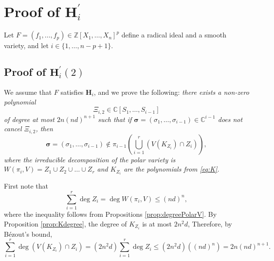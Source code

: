 \documentclass[a4paper]{article}
\newcommand{\ZZ}{{\mathbb{Z}}}
\def\C{\mathbb{C}}
\begin{document}
\section{Proof of $\textbf{H}_i^{'}$}\label{Sec:Hip}
Let $F = (f_1,\hdots,f_p) \in \ZZ[X_1,\hdots,X_n]^p$  define a radical ideal and a smooth variety, and let $i\in \{1,\hdots,n-p+1\}$. 
\subsection{Proof of $\textbf{H}_i^{'}(2)$}\label{proof:hip2}
%
We assume that $F$ satisfies $\textbf{H}_i$, and we prove the following: {\em
  there exists a non-zero polynomial 
  \[\Xi_{i,2} \in
  \C[S_1,\dots,S_{i-1}]\] 
  of degree at most $2n(nd)^{n+1}$ such that if $
  \bm \sigma = (\sigma_1,\hdots,\sigma_{i-1}) \in \C^{i-1}$ does not cancel
  $\Xi_{i,2}$, then 
  \[\bm \sigma = (\sigma_1,\hdots,\sigma_{i-1}) \not \in \pi_{i-1} \left(\bigcup_{i=1}^r \left(V(K_{Z_i}) \cap Z_i\right)\right),\]
  where the irreducible decomposition of the polar variety is $W(\pi_i,V) = Z_1 \cup Z_2 \cup \hdots \cup Z_r$ and $K_{Z_i}$ are the polynomials from \ref{eq:K}.}

\smallskip


First note that 
\[
\sum_{i=1}^r \deg Z_i = \deg W(\pi_i,V) \leq (nd)^n,
\]
where the inequality follows from Propositions \ref{prop:degreePolarV}. By Proposition \ref{prop:Kdegree}, the degree of $K_{Z_i}$ is at most $2n^2d$, Therefore, by B\'ezout's bound,
\[
\sum_{i=1}^r \deg (V(K_{Z_i}) \cap Z_i) = (2n^2d)\sum_{i=1}^r \deg Z_i \leq (2n^2d)((nd)^n) = 2n(nd)^{n+1}.
\]
\end{document}
